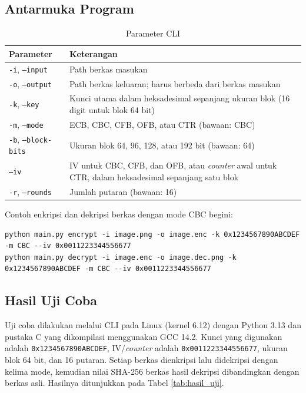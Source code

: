 \subsection{Antarmuka Program}

\begin{table}[H]
    \centering
    \small
    \caption{Parameter CLI}
    \label{tab:parameter_cli}
    \begin{tabularx}{\textwidth}{@{}l >{\raggedright\arraybackslash}X@{}}
        \toprule
        \textbf{Parameter} & \textbf{Keterangan} \\
        \midrule
        \texttt{-i}, \texttt{--input} & Path berkas masukan \\
        \texttt{-o}, \texttt{--output} & Path berkas keluaran; harus berbeda dari berkas masukan \\
        \texttt{-k}, \texttt{--key} & Kunci utama dalam heksadesimal sepanjang ukuran blok (16 digit untuk blok 64 bit) \\
        \texttt{-m}, \texttt{--mode} & ECB, CBC, CFB, OFB, atau CTR (bawaan: CBC) \\
        \texttt{-b}, \texttt{--block-bits} & Ukuran blok 64, 96, 128, atau 192 bit (bawaan: 64) \\
        \texttt{--iv} & IV untuk CBC, CFB, dan OFB, atau \textit{counter} awal untuk CTR, dalam heksadesimal sepanjang satu blok \\
        \texttt{-r}, \texttt{--rounds} & Jumlah putaran (bawaan: 16) \\
        \bottomrule
    \end{tabularx}
\end{table}

Contoh enkripsi dan dekripsi berkas dengan mode CBC begini:
\begin{lstlisting}[basicstyle=\ttfamily\small,breaklines=true]
python main.py encrypt -i image.png -o image.enc -k 0x1234567890ABCDEF -m CBC --iv 0x0011223344556677
python main.py decrypt -i image.enc -o image.dec.png -k 0x1234567890ABCDEF -m CBC --iv 0x0011223344556677
\end{lstlisting}

\subsection{Hasil Uji Coba}
Uji coba dilakukan melalui CLI pada Linux (kernel 6.12) dengan Python 3.13 dan pustaka C yang dikompilasi menggunakan GCC 14.2. Kunci yang digunakan adalah \texttt{0x1234567890ABCDEF}, IV/\textit{counter} adalah \texttt{0x0011223344556677}, ukuran blok 64 bit, dan 16 putaran. Setiap berkas dienkripsi lalu didekripsi dengan kelima mode, kemudian nilai SHA-256 berkas hasil dekripsi dibandingkan dengan berkas asli. Hasilnya ditunjukkan pada Tabel \ref{tab:hasil_uji}.

